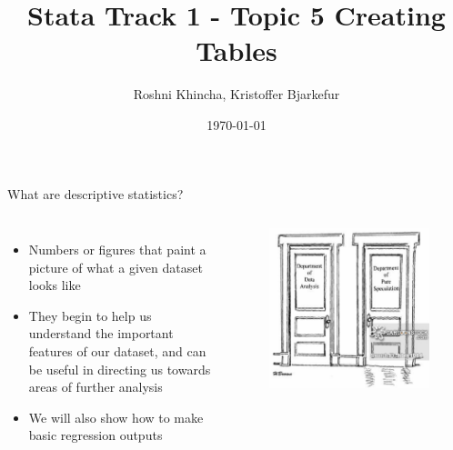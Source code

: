 \documentclass[aspectratio=169]{beamer}
\title{Stata Track 1 - Topic 5 \newline Creating Tables}
\date{\today}
\author{Roshni Khincha, Kristoffer Bjarkefur} %
\institute{Development Impact Evaluation (DIME) \newline The World Bank }
\begin{document}
	{
		\maketitle
	}

\begin{frame}[fragile]{What are descriptive statistics?}
	\begin{columns}[c]
		\begin{itemize}
			\item Numbers or figures that paint a picture of what a given dataset looks like
			\item They begin to help us understand the important features of our dataset, and can be useful in directing us towards areas of further analysis
			\item We will also show how to make basic regression outputs
		\end{itemize}
		\begin{figure}
			\centering
			\includegraphics[width=\linewidth]{img/descriptivecartoon}
		\end{figure}
	\end{columns}
\end{frame}
\end{document}
